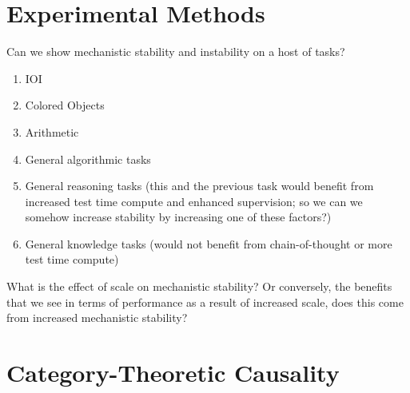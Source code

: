\documentclass[10pt]{article}
\begin{document}
\section{Experimental Methods}
Can we show mechanistic stability and instability on a host of tasks?
\begin{enumerate}
\item IOI
\item Colored Objects
\item Arithmetic
\item General algorithmic tasks
\item General reasoning tasks (this and the previous task would benefit
from increased test time compute and enhanced supervision; so we can we
somehow increase stability by increasing one of these factors?)
\item General knowledge tasks (would not benefit from chain-of-thought or more
test time compute)
\end{enumerate}
What is the effect of scale on mechanistic stability? Or conversely, the benefits
that we see in terms of performance as a result of increased scale, does this
come from increased mechanistic stability?




\newpage
\section{Category-Theoretic Causality}
\end{document}
